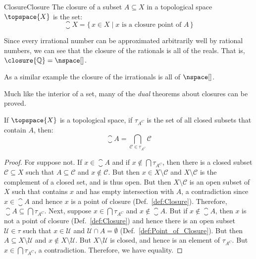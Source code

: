         \begin{fdefinition}{Closure}{Closure}
            The closure of a subset $A\subseteq{X}$ in a topological space
            $\topspace{X}$ is the set:
            \begin{equation*}
                \closure{X}=\{\,x\in{X}\;|\;
                    x\textrm{ is a closure point of }A\,\}
            \end{equation*}
        \end{fdefinition}
        \begin{example}
            Since every irrational number can be approximated arbitrarily
            well by rational numbers, we can see that the closure of the
            rationals is all of the reals. That is,
            $\closure{\mathbb{Q}}=\nspace[]$.
        \end{example}
        \begin{example}
            As a similar example the closure of the irrationals is all of
            $\nspace[]$.
        \end{example}
        Much like the interior of a set, many of the \textit{dual} theorems
        about closures can be proved.
        \begin{theorem}
            \label{thm:Alt_Equiv_Def_Closure_of_Set}%
            If $\topspace{X}$ is a topological space, if $\tau_{A^{C}}$ is
            the set of all closed subsets that contain $A$, then:
            \begin{equation}
                \closure{A}=\bigcap_{\mathcal{C}\in\tau_{A^{C}}}\mathcal{C}
            \end{equation}
        \end{theorem}
        \begin{proof}
            For suppose not. If $x\in\closure{A}$ and if
            $x\notin\bigcap\tau_{A^{C}}$, then there is a closed subset
            $\mathcal{C}\subseteq{X}$ such that $A\subseteq\mathcal{C}$ and
            $x\notin\mathcal{C}$. But then $x\in{X}\setminus\mathcal{C}$ and
            $X\setminus\mathcal{C}$ is the complement of a closed set, and
            is thus open. But then $X\setminus\mathcal{C}$ is an open subset
            of $X$ such that contains $x$ and has empty intersection with
            $A$, a contradiction since $x\in\closure{A}$ and hence $x$ is a
            point of closure (Def.~\ref{def:Closure}). Therefore,
            $\closure{A}\subseteq\bigcap\tau_{A^{C}}$. Next, suppose
            $x\in\bigcap\tau_{A^{C}}$ and $x\notin\closure{A}$. But if
            $x\notin\closure{A}$, then $x$ is not a point of closure
            (Def.~\ref{def:Closure}) and hence there is an open subset
            $\mathcal{U}\in\tau$ such that $x\in\mathcal{U}$ and
            $\mathcal{U}\cap{A}=\emptyset$
            (Def.~\ref{def:Point_of_Closure}). But then
            $A\subseteq{X}\setminus\mathcal{U}$ and
            $x\notin{X}\setminus\mathcal{U}$. But $X\setminus\mathcal{U}$
            is closed, and hence is an element of $\tau_{A^{C}}$. But
            $x\in\bigcap\tau_{A^{C}}$, a contradiction. Therefore, we have
            equality.
        \end{proof}
